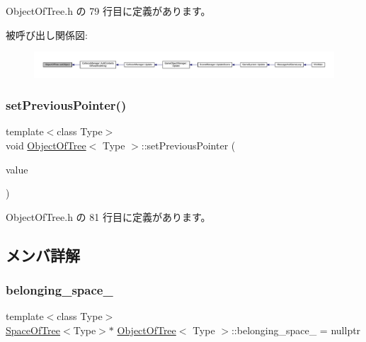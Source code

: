  Object\+Of\+Tree.\+h の 79 行目に定義があります。

被呼び出し関係図\+:
\nopagebreak
\begin{figure}[H]
\begin{center}
\leavevmode
\includegraphics[width=350pt]{class_object_of_tree_aae14cb0e8ac8b701de737c547a1d3b8c_icgraph}
\end{center}
\end{figure}
\mbox{\label{class_object_of_tree_aa0ec8f6f61eb41f346796141e8ec38d5}} 
\subsubsection{\texorpdfstring{set\+Previous\+Pointer()}{setPreviousPointer()}}
{\footnotesize\ttfamily template$<$class Type$>$ \\
void \mbox{\hyperlink{class_object_of_tree}{Object\+Of\+Tree}}$<$ Type $>$\+::set\+Previous\+Pointer (\begin{DoxyParamCaption}\item[{\mbox{\hyperlink{class_object_of_tree}{Object\+Of\+Tree}}$<$ Type $>$ $\ast$}]{value }\end{DoxyParamCaption})\hspace{0.3cm}{\ttfamily [inline]}}



 Object\+Of\+Tree.\+h の 81 行目に定義があります。



\subsection{メンバ詳解}
\mbox{\label{class_object_of_tree_a4f0673854adc10539b4b99558ea3b696}} 
\subsubsection{\texorpdfstring{belonging\+\_\+space\+\_\+}{belonging\_space\_}}
{\footnotesize\ttfamily template$<$class Type$>$ \\
\mbox{\hyperlink{class_space_of_tree}{Space\+Of\+Tree}}$<$Type$>$$\ast$ \mbox{\hyperlink{class_object_of_tree}{Object\+Of\+Tree}}$<$ Type $>$\+::belonging\+\_\+space\+\_\+ = nullptr\hspace{0.3cm}{\ttfamily [private]}}



